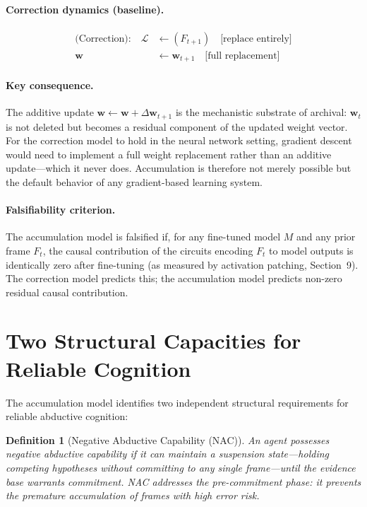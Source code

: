 \documentclass[12pt]{article}
\newtheorem{definition}{Definition}
\begin{document}
\paragraph{Correction dynamics (baseline).}
\begin{align*}
\text{(Correction):} \quad
\mathcal{L} &\leftarrow (F_{t+1})
\quad \text{[replace entirely]}\\
\mathbf{w} &\leftarrow \mathbf{w}_{t+1}
\quad \text{[full replacement]}
\end{align*}

\paragraph{Key consequence.}
The additive update $\mathbf{w} \leftarrow \mathbf{w} + \Delta\mathbf{w}_{t+1}$
is the mechanistic substrate of archival:
$\mathbf{w}_{t}$ is not deleted but becomes a residual component of
the updated weight vector.
For the correction model to hold in the neural network setting,
gradient descent would need to implement a full weight replacement
rather than an additive update---which it never does.
Accumulation is therefore not merely possible but the default
behavior of any gradient-based learning system.

\paragraph{Falsifiability criterion.}
The accumulation model is falsified if, for any fine-tuned model $M$
and any prior frame $F_t$, the causal contribution of the circuits
encoding $F_t$ to model outputs is identically zero after fine-tuning
(as measured by activation patching, Section~9).
The correction model predicts this; the accumulation model predicts
non-zero residual causal contribution.

\section{Two Structural Capacities for Reliable Cognition}

The accumulation model identifies two independent structural
requirements for reliable abductive cognition:

\begin{definition}[Negative Abductive Capability (NAC)]
An agent possesses \emph{negative abductive capability} if it
can maintain a suspension state---holding competing hypotheses
without committing to any single frame---until the evidence base
warrants commitment.
NAC addresses the \emph{pre-commitment} phase: it prevents the
premature accumulation of frames with high error risk.
\end{definition}
\end{document}
